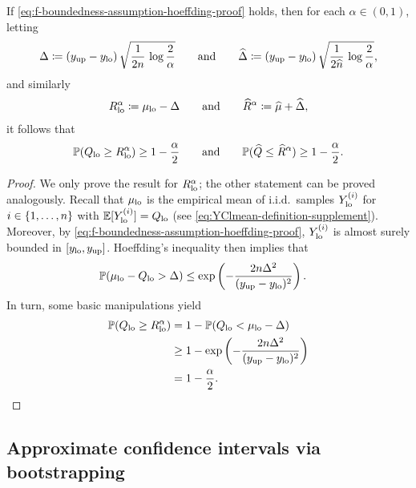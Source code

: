

\begin{proposition} \label{prop:hoeffding-confidence-bounds-supp}
If \eqref{eq:f-boundedness-assumption-hoeffding-proof} holds, then for each $\alpha \in (0, 1)$, letting
\[
    \Delta \coloneqq (y_{\mathrm{up}} - y_{\mathrm{lo}}) \, \sqrt{\frac{1}{2 n} \, \log \frac{2}{\alpha}}  \qquad \text{and} \qquad \widehat{\Delta} \coloneqq (y_{\mathrm{up}} - y_{\mathrm{lo}}) \, \sqrt{\frac{1}{2 \widehat{n}} \, \log \frac{2}{\alpha}},
\]
and similarly
\begin{align*}
    R_{\mathrm{lo}}^{\alpha} \coloneqq {\mu_{\mathrm{lo}}} - \Delta  \qquad \text{and} \qquad
    \widehat{R}^{\alpha} \coloneqq \widehat{\mu} + \widehat{\Delta},
\end{align*}
it follows that
\begin{align*}
    \mathbb{P}(Q_{\mathrm{lo}} \geq R_{\mathrm{lo}}^{\alpha}) \geq 1 - \frac{\alpha}{2} \qquad \text{and} \qquad \mathbb{P}(\widehat{Q} \leq \widehat{R}^{\alpha}) \geq 1 - \frac{\alpha}{2}.
\end{align*}
\end{proposition}

\begin{proof}
We only prove the result for $R_{\mathrm{lo}}^{\alpha}$; the other statement can be proved analogously.
Recall that ${\mu_{\mathrm{lo}}}$ is the empirical mean of i.i.d.\ samples $Y_{\mathrm{lo}}^{(i)}$ for $i\in \{1, \ldots, n\}$ with $\mathbb{E}[Y_{\mathrm{lo}}^{(i)}]=Q_{\mathrm{lo}}$ (see \eqref{eq:YClmean-definition-supplement}).
Moreover, by \eqref{eq:f-boundedness-assumption-hoeffding-proof}, $Y_{\mathrm{lo}}^{(i)}$ is almost surely bounded in $[y_{\mathrm{lo}}, y_{\mathrm{up}}]$.
Hoeffding's inequality then implies that
\begin{align*}
    \mathbb{P}({\mu_{\mathrm{lo}}} - Q_{\mathrm{lo}} > \Delta) &\leq \exp\left(- \frac{2 n \Delta^2}{(y_{\mathrm{up}} - y_{\mathrm{lo}})^2 } \right).
\end{align*}
In turn, some basic manipulations yield
\begin{align*}
    \mathbb{P}(Q_{\mathrm{lo}} \geq R_{\mathrm{lo}}^{\alpha}) &= 1 - \mathbb{P}(Q_{\mathrm{lo}} < {\mu_{\mathrm{lo}}} - \Delta) \\
    &\geq 1 - \exp\left(- \frac{2 n \Delta^2}{(y_{\mathrm{up}} - y_{\mathrm{lo}})^2 } \right) \\
    &= 1- \frac{\alpha}{2}.
\end{align*}
\end{proof}

\subsection{Approximate confidence intervals via bootstrapping} \label{subsec:bootstrapping}

